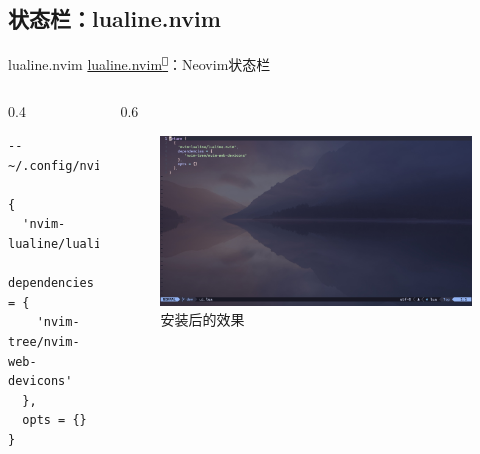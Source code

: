 \documentclass[aspectratio=169]{ctexbeamer}
\newcommand{\nerd}[1]{\texttt{#1}}
\newcommand{\link}[3][]{\href{#3}{#2\textsuperscript{\nerd{}}}}
\begin{document}
  \subsection{状态栏：lualine.nvim}
    \begin{frame}[fragile]{lualine.nvim}
      \link{lualine.nvim}{https://github.com/nvim-lualine/lualine.nvim}：Neovim状态栏

      \begin{columns}
        \begin{column}{0.4\linewidth}
          \begin{lstlisting}[basicstyle=\tiny\ttfamily]
-- ~/.config/nvim/lua/plugins/ui.lua

{
  'nvim-lualine/lualine.nvim',
  dependencies = {
    'nvim-tree/nvim-web-devicons'
  },
  opts = {}
}
          \end{lstlisting}
        \end{column}

        \begin{column}{0.6\linewidth}
          \begin{figure}[H]
            \centering
            \includegraphics[width=\linewidth]{./Figures/Lualine_Finish.jpg}
            \caption{安装后的效果}%
          \end{figure}

        \end{column}
      \end{columns}

    \end{frame}
\end{document}
